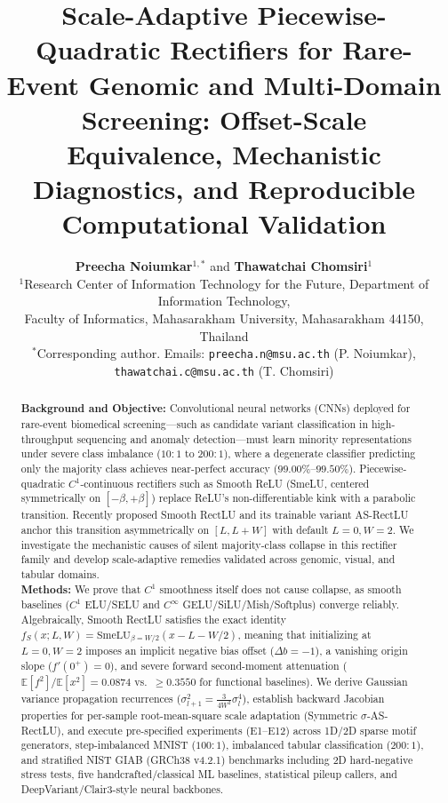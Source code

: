 \documentclass[10pt,a4paper]{article}
\title{\textbf{Scale-Adaptive Piecewise-Quadratic Rectifiers for Rare-Event Genomic and Multi-Domain Screening: Offset-Scale Equivalence, Mechanistic Diagnostics, and Reproducible Computational Validation}}
\author{
    \textbf{Preecha Noiumkar}$^{1,*}$ and \textbf{Thawatchai Chomsiri}$^{1}$ \\[0.4em]
    \small $^{1}$Research Center of Information Technology for the Future, Department of Information Technology, \\
    \small Faculty of Informatics, Mahasarakham University, Mahasarakham 44150, Thailand \\[0.2em]
    \small $^{*}$Corresponding author. Emails: \texttt{preecha.n@msu.ac.th} (P. Noiumkar), \texttt{thawatchai.c@msu.ac.th} (T. Chomsiri)
}
\date{}
\begin{document}
\maketitle

\begin{abstract}
\noindent
\textbf{Background and Objective:} Convolutional neural networks (CNNs) deployed for rare-event biomedical screening---such as candidate variant classification in high-throughput sequencing and anomaly detection---must learn minority representations under severe class imbalance ($10:1$ to $200:1$), where a degenerate classifier predicting only the majority class achieves near-perfect accuracy ($99.00\%$--$99.50\%$). Piecewise-quadratic $C^1$-continuous rectifiers such as Smooth ReLU (SmeLU, centered symmetrically on $[-\beta, +\beta]$) replace ReLU's non-differentiable kink with a parabolic transition. Recently proposed Smooth RectLU and its trainable variant AS-RectLU anchor this transition asymmetrically on $[L, L+W]$ with default $L=0, W=2$. We investigate the mechanistic causes of silent majority-class collapse in this rectifier family and develop scale-adaptive remedies validated across genomic, visual, and tabular domains. \\
\textbf{Methods:} We prove that $C^1$ smoothness itself does not cause collapse, as smooth baselines ($C^1$ ELU/SELU and $C^\infty$ GELU/SiLU/Mish/Softplus) converge reliably. Algebraically, Smooth RectLU satisfies the exact identity $f_S(x; L, W) = \text{SmeLU}_{\beta=W/2}(x - L - W/2)$, meaning that initializing at $L=0, W=2$ imposes an implicit negative bias offset ($\Delta b = -1$), a vanishing origin slope ($f'(0^+)=0$), and severe forward second-moment attenuation ($\mathbb{E}[f^2]/\mathbb{E}[x^2] = 0.0874$ vs.\ $\ge 0.3550$ for functional baselines). We derive Gaussian variance propagation recurrences ($\sigma_{l+1}^2 = \frac{3}{4W^2}\sigma_l^4$), establish backward Jacobian properties for per-sample root-mean-square scale adaptation (Symmetric $\sigma$-AS-RectLU), and execute pre-specified experiments (E1--E12) across 1D/2D sparse motif generators, step-imbalanced MNIST ($100:1$), imbalanced tabular classification ($200:1$), and stratified NIST GIAB (GRCh38 v4.2.1) benchmarks including 2D hard-negative stress tests, five handcrafted/classical ML baselines, statistical pileup callers, and DeepVariant/Clair3-style neural backbones. \\

\end{abstract}
\end{document}

